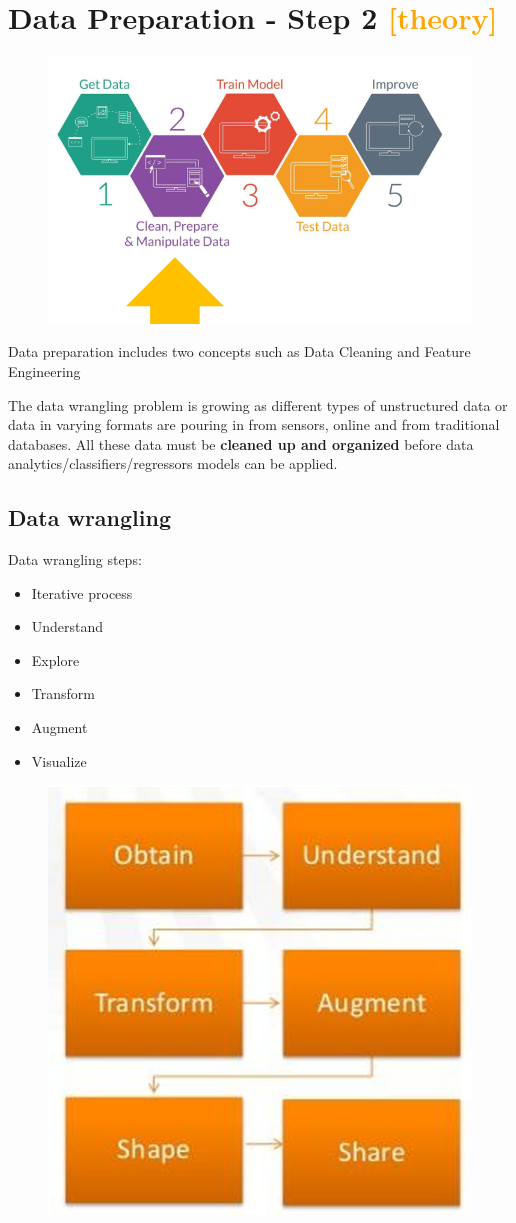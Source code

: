 \section{Data Preparation - Step 2 \textcolor{orange}{[theory]}}
\begin{figure}[H]
    \centering
    \includegraphics[width=0.8\linewidth]{07-08/images/step2.png}
\end{figure}

\noindent Data preparation includes two concepts such as Data Cleaning and Feature Engineering

\noindent The data wrangling problem is growing as different types of unstructured data or data in varying formats are pouring in from sensors, online and from traditional databases. 
All these data must be \textbf{cleaned up and organized } before data analytics/classifiers/regressors models can be applied.

\subsection{Data wrangling}
\noindent Data wrangling steps:
\begin{itemize}
    \item Iterative process
    \item Understand
    \item Explore
    \item Transform
    \item Augment
    \item Visualize
\end{itemize}

\begin{figure}[H]
    \centering
    \includegraphics[width=0.6\linewidth]{07-08/images/data wrangling.png}
\end{figure}

